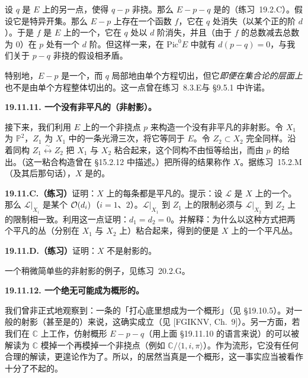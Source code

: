 设 $q$ 是 $E$ 上的另一点，使得 $q-p$ 非挠。那么 $E-p-q$ 是\trAffine{}的（\mbox{练习~19.2.C}）。假设它是特异开集。那么 $E-p$ 上存在一个函数 $f$，它在 $q$ 处消失（以某个正的阶 $d$）。于是 $f$ 是 $E$ 上的一个\trRationalFunction，它在 $q$ 处以 $d$ 阶消失，并且（由于 $f$ 的\trZeros{}总数减去\trPole{}总数为 $0$）在 $p$ 处有一个 $d$ 阶\trPole。但这样一来，在 $\mathrm{Pic}^0E$ 中就有 $d(p-q)=0$，与我们关于 $p-q$ 非挠的假设相矛盾。

特别地，$E-p$ 是一个\trAffine\trScheme，而 $q$ 局部地由单个方程切出，但它\emph{即便在集合论的层面上}也不是由单个方程整体切出的。这一点曾在\mbox{练习~8.3.E}与 \S9.5.1 中许诺。

\textbf{19.11.11. 一个没有非平凡\trLineBundle{}的\trProper（非射影）\trSurface。}

接下来，我们利用\trEllipticCurve{} $E$ 上的一个非挠点 $p$ 来构造一个没有非平凡\trLineBundle{}的\trProper{}非射影\trSurface。令 $X_1$ 为 $\mathbb{P}^2$，$Z_1$ 为 $X_1$ 中的一条光滑三次\trCurve，将它等同于 $E$。令 $Z_2\subset X_2$ 完全同样。沿着同构 $Z_1\overset{\sim}{\longleftrightarrow}Z_2$ 把 $X_1$ 与 $X_2$ 粘合起来，这个同构不由恒等给出，而由 $p$ 的\trTranslation{}给出。（这一粘合构造曾在 \S15.2.12 中描述。）把所得的结果称作 $X$。据\mbox{练习~15.2.M}（及其后那句话），$X$ 是\trProper{}的。

\textbf{19.11.C.（练习）}\quad 证明：$X$ 上的每条\trLineBundle{}都是平凡的。提示：设 $\mathscr{L}$ 是 $X$ 上的一个\trInvertibleSheaf。那么 $\mathscr{L}|_{X_i}$ 是某个 $\mathcal{O}(d_i)$（$i=1$、$2$）。$\mathscr{L}|_{X_1}$ 到 $Z_1$ 上的限制必须与 $\mathscr{L}|_{X_2}$ 到 $Z_2$ 上的限制相一致。利用这一点证明：$d_1=d_2=0$。并解释：为什么以这种方式把两个平凡的丛（分别在 $X_1$ 与 $X_2$ 上）粘合起来，得到的便是 $X$ 上的一个平凡丛。

\textbf{19.11.D.（练习）}\quad 证明：$X$ 不是射影的。

一个稍微简单些的\trProper{}非射影\trSurface{}的例子，见\mbox{练习~20.2.G}。

\textbf{19.11.12. 一个绝无可能成为概形的\trPicardGroup。}

我们曾非正式地观察到：一条\trEllipticCurve{}的\trPicardGroup{}「打心底里想成为一个概形」（见 \S19.10.5）。对一般的射影（甚至是\trProper{}的）\trVariety{}来说，这确实成立（见 [FGIKNV, Ch.~9]）。另一方面，若我们在 $\mathbb{C}$ 上工作，仿射概形 $E-p-q$（用上面 \S19.11.10 的语言来说）的\trPicardGroup{}可以被解读为 $\mathbb{C}$ 模掉一个\trLattice{}再模掉一个非挠点（例如 $\mathbb{C}/\langle 1,i,\pi\rangle$）。作为流形，它没有任何合理的解读，更遑论作为\trVariety{}了。所以，\trProper{}\trVariety{}的\trPicardGroup{}居然当真是一个概形，这一事实应当被看作十分了不起的。


